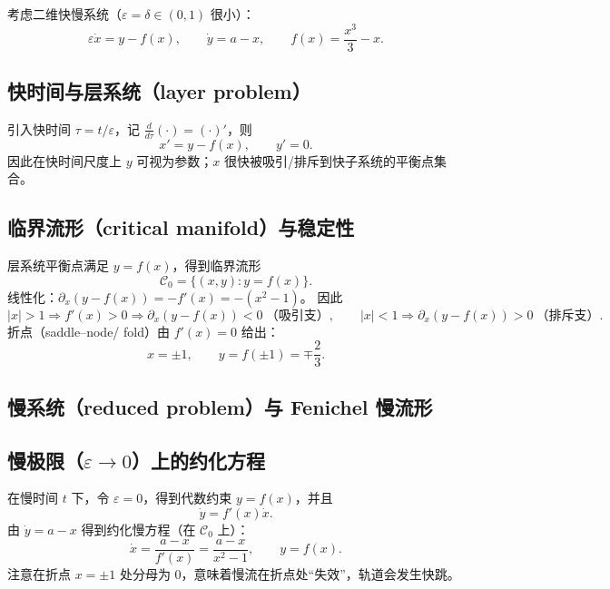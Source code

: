 考虑二维快慢系统（$\varepsilon=\delta\in(0,1)$ 很小）：
\begin{equation}\label{eq:model}
	\varepsilon \dot x = y - f(x),\qquad \dot y = a-x,
	\qquad f(x)=\frac{x^3}{3}-x .
\end{equation}

\subsection{快时间与层系统（layer problem）}
引入快时间 $\tau=t/\varepsilon$，记 $\frac{d}{d\tau}(\cdot)=(\cdot)'$，则
\begin{equation}\label{eq:layer}
	x' = y-f(x),\qquad y'=0 .
\end{equation}
因此在快时间尺度上 $y$ 可视为参数；$x$ 很快被吸引/排斥到快子系统的平衡点集合。

\subsection{临界流形（critical manifold）与稳定性}
层系统平衡点满足 $y=f(x)$，得到临界流形
\begin{equation}\label{eq:C0}
	\mathcal C_0=\{(x,y): y=f(x)\}.
\end{equation}
线性化：$\partial_x(y-f(x)) = -f'(x)=-(x^2-1)$。
因此
\[
|x|>1\Rightarrow f'(x)>0 \Rightarrow \partial_x(y-f(x))<0 \ \text{（吸引支）},\qquad
|x|<1\Rightarrow \partial_x(y-f(x))>0 \ \text{（排斥支）}.
\]
折点（saddle--node/ fold）由 $f'(x)=0$ 给出：
\begin{equation}\label{eq:folds}
	x=\pm 1,\qquad y=f(\pm 1)=\mp\frac{2}{3}.
\end{equation}

\subsection{慢系统（reduced problem）与 Fenichel 慢流形}

\subsection{慢极限（$\varepsilon\to0$）上的约化方程}
在慢时间 $t$ 下，令 $\varepsilon=0$，得到代数约束 $y=f(x)$，并且
\[
\dot y = f'(x)\dot x.
\]
由 $\dot y=a-x$ 得到约化慢方程（在 $\mathcal C_0$ 上）：
\begin{equation}\label{eq:reduced}
	\dot x = \frac{a-x}{f'(x)}=\frac{a-x}{x^2-1},
	\qquad y=f(x).
\end{equation}
注意在折点 $x=\pm1$ 处分母为 $0$，意味着慢流在折点处“失效”，轨道会发生快跳。

